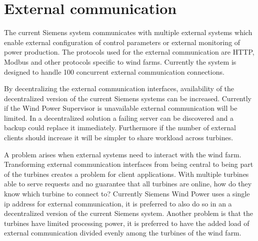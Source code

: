 \section{External communication} %
\label{cha:resourceManagement}

The current Siemens system communicates with multiple external systems which enable external configuration of control parameters or external monitoring of power production. The protocols used for the external communication are HTTP, Modbus and other protocols specific to wind farms. Currently the system is designed to handle 100 concurrent external communication connections.

By decentralizing the external communication interfaces, availability of the decentralized version of the current Siemens systems can be increased. Currently if the Wind Power Supervisor is unavailable external communication will be limited. In a decentralized solution a failing server can be discovered and a backup could replace it immediately. Furthermore if the number of external clients should increase it will be simpler to share workload across turbines.

A problem arises when external systems need to interact with the wind farm. 
Transforming external communication interfaces from being central to being part of the turbines creates a problem for client applications.
With multiple turbines able to serve requests and no guarantee that all turbines are online, how do they know which turbine to connect to?
Currently Siemens Wind Power uses a single ip address for external communication, it is preferred to also do so in an a decentralized version of the current Siemens system.
Another problem is that the turbines have limited processing power, it is preferred to have the added load of external communication divided evenly among the turbines of the wind farm.

